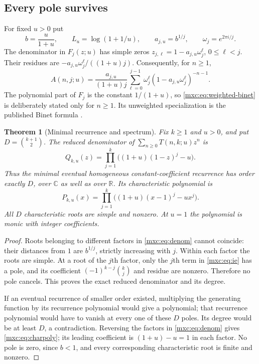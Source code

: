 \documentclass[11pt]{article}
\numberwithin{equation}{section}
\newtheorem{theorem}{Theorem}[section]
\theoremstyle{definition}
\theoremstyle{remark}
\begin{document}
\subsection{Every pole survives}
For fixed $u>0$ put
\[
 b=\frac{u}{1+u},\qquad L_u=\log(1+1/u),\qquad
 a_{j,u}=b^{1/j},\qquad \omega_j=e^{2\pi i/j}.
\]
The denominator in $F_j(z;u)$ has simple zeros
$z_{j,\ell}=1-a_{j,u}\omega_j^\ell$, $0\le\ell<j$.
Their residues are $-a_{j,u}\omega_j^\ell/((1+u)j)$.
Consequently, for $n\ge1$,
\begin{equation}\label{mxc:eq:weighted-binet}
 A(n,j;u)=\frac{a_{j,u}}{(1+u)j}
  \sum_{\ell=0}^{j-1}\omega_j^\ell
     (1-a_{j,u}\omega_j^\ell)^{-n-1}.
\end{equation}
The polynomial part of $F_j$ is the constant $1/(1+u)$, so
\eqref{mxc:eq:weighted-binet} is deliberately stated only for $n\ge1$.
Its unweighted specialization is the published Binet formula
\cite[Proposition~12]{mpr2009}.

\begin{theorem}[Minimal recurrence and spectrum]\label{mxc:thm:minimal}
Fix $k\ge1$ and $u>0$, and put $D=\binom{k+1}{2}$. The reduced
denominator of $\sum_{n\ge0}T(n,k;u)z^n$ is
\begin{equation}\label{mxc:eq:denom}
 Q_{k,u}(z)=\prod_{j=1}^k\bigl((1+u)(1-z)^j-u\bigr).
\end{equation}
Thus the minimal eventual homogeneous constant-coefficient recurrence has
order exactly $D$, over $\mathbb C$ as well as over $\mathbb R$.
Its characteristic polynomial is
\begin{equation}\label{mxc:eq:charpoly}
 P_{k,u}(x)=\prod_{j=1}^k\bigl((1+u)(x-1)^j-u x^j\bigr).
\end{equation}
All $D$ characteristic roots are simple and nonzero. At $u=1$ the
polynomial is monic with integer coefficients.
\end{theorem}
\begin{proof}
Roots belonging to different factors in \eqref{mxc:eq:denom} cannot coincide:
their distances from $1$ are $b^{1/j}$, strictly increasing with $j$.
Within each factor the roots are simple. At a root of the $j$th factor,
only the $j$th term in \eqref{mxc:eq:ie} has a pole, and its coefficient
$(-1)^{k-j}\binom{k}{j}$ and residue are nonzero. Therefore no pole
cancels. This proves the exact reduced denominator and its degree.

If an eventual recurrence of smaller order existed, multiplying the
generating function by its recurrence polynomial would give a polynomial;
that recurrence polynomial would have to vanish at every one of these
$D$ poles. Its degree would be at least $D$, a contradiction. Reversing
the factors in \eqref{mxc:eq:denom} gives \eqref{mxc:eq:charpoly}; its leading
coefficient is $(1+u)-u=1$ in each factor. No pole is zero, since
$b<1$, and every corresponding characteristic root is finite and nonzero.
\end{proof}
\end{document}
